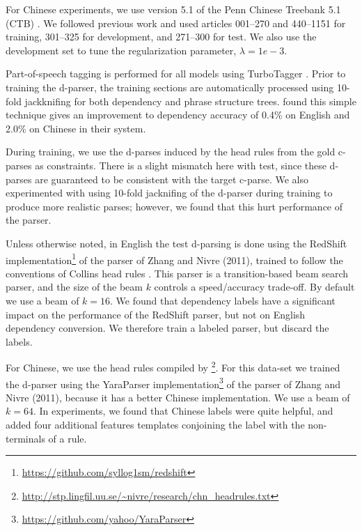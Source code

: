 \documentclass[11pt,letterpaper]{article}
\newcommand{\nascomment}[1]{\textcolor{blue}{\bf \small [#1 --nas]}}
\begin{document}
For Chinese experiments, we use version 5.1 of the Penn  Chinese Treebank 5.1 (CTB) \cite{xue2005penn}. We followed previous work and used
articles 001--270 and 440--1151 for training, 
301--325 for development, and 
271--300 for test. We also use the development set to tune the regularization parameter, $\lambda=1e-3$.

Part-of-speech tagging is performed for all models using TurboTagger
\cite{martins2013turning}.  Prior to training the d-parser, the
training sections are automatically processed using 10-fold
jackknifing \cite{collins2005discriminative} for both dependency and phrase
structure trees.  found this simple technique
gives an improvement to dependency accuracy of 0.4\% on English and
2.0\% on Chinese in their system. 

During training, we use the d-parses induced by the head rules from
the gold c-parses as constraints. There is a slight mismatch here with
test, since these d-parses are guaranteed to be consistent with the
target c-parse. We also experimented with using 10-fold jacknifing of
the d-parser during training to produce more realistic parses; however, 
we found that this hurt performance of the parser.


Unless otherwise noted, in English the test d-parsing is done using
the RedShift
implementation\footnote{\url{https://github.com/syllog1sm/redshift}}
of the parser of Zhang and Nivre (2011), trained to
follow the conventions of Collins head rules
\cite{collins2003head}. This parser is a transition-based beam search
parser, and the size of the beam $k$ controls a speed/accuracy
trade-off.  By default we use a beam of $k=16$.  We found that
dependency labels have a significant impact on the performance of the
RedShift parser, but not on English dependency conversion. We therefore train
a labeled parser, but discard the labels.

For Chinese, we use the head rules compiled by
\footnote{\url{http://stp.lingfil.uu.se/~nivre/research/chn_headrules.txt}}.
For this data-set we trained the d-parser using the YaraParser implementation\footnote{\url{https://github.com/yahoo/YaraParser}}
of the parser of Zhang and Nivre (2011), because it has a better Chinese implementation. 
We use a beam of $k=64$.
In experiments, we found that Chinese labels were quite helpful, and added four
additional features templates conjoining the label with the
non-terminals of a rule.
\end{document}
